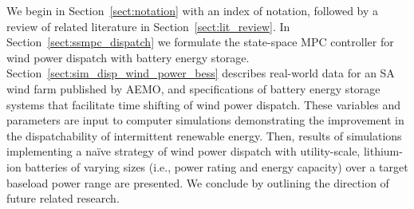 We begin in Section~\ref{sect:notation} with an index of notation, followed by a review of related literature in Section~\ref{sect:lit_review}.  In Section~\ref{sect:ssmpc_dispatch} we formulate the state-space MPC controller for wind power dispatch with battery energy storage.  Section~\ref{sect:sim_disp_wind_power_bess} describes real-world data for an SA wind farm published by AEMO, and specifications of battery energy storage systems that facilitate time shifting of wind power dispatch.  These variables and parameters are input to computer simulations demonstrating the improvement in the dispatchability of intermittent renewable energy.  Then, results of simulations implementing a na\"ive strategy of wind power dispatch with utility-scale, lithium-ion batteries of varying sizes (i.e., power rating and energy capacity) over a target baseload power range are presented.  We conclude by outlining the direction of future related research.

